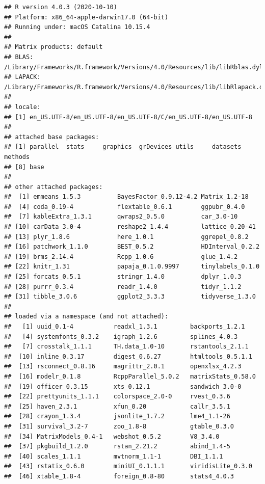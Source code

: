 \documentclass[
  11pt,
  english,
  ,doc,floatsintext]{apa6}
\begin{document}
\begin{verbatim}
## R version 4.0.3 (2020-10-10)
## Platform: x86_64-apple-darwin17.0 (64-bit)
## Running under: macOS Catalina 10.15.4
## 
## Matrix products: default
## BLAS:   /Library/Frameworks/R.framework/Versions/4.0/Resources/lib/libRblas.dylib
## LAPACK: /Library/Frameworks/R.framework/Versions/4.0/Resources/lib/libRlapack.dylib
## 
## locale:
## [1] en_US.UTF-8/en_US.UTF-8/en_US.UTF-8/C/en_US.UTF-8/en_US.UTF-8
## 
## attached base packages:
## [1] parallel  stats     graphics  grDevices utils     datasets  methods  
## [8] base     
## 
## other attached packages:
##  [1] emmeans_1.5.3          BayesFactor_0.9.12-4.2 Matrix_1.2-18         
##  [4] coda_0.19-4            flextable_0.6.1        ggpubr_0.4.0          
##  [7] kableExtra_1.3.1       qwraps2_0.5.0          car_3.0-10            
## [10] carData_3.0-4          reshape2_1.4.4         lattice_0.20-41       
## [13] plyr_1.8.6             here_1.0.1             ggrepel_0.8.2         
## [16] patchwork_1.1.0        BEST_0.5.2             HDInterval_0.2.2      
## [19] brms_2.14.4            Rcpp_1.0.6             glue_1.4.2            
## [22] knitr_1.31             papaja_0.1.0.9997      tinylabels_0.1.0      
## [25] forcats_0.5.1          stringr_1.4.0          dplyr_1.0.3           
## [28] purrr_0.3.4            readr_1.4.0            tidyr_1.1.2           
## [31] tibble_3.0.6           ggplot2_3.3.3          tidyverse_1.3.0       
## 
## loaded via a namespace (and not attached):
##   [1] uuid_0.1-4           readxl_1.3.1         backports_1.2.1     
##   [4] systemfonts_0.3.2    igraph_1.2.6         splines_4.0.3       
##   [7] crosstalk_1.1.1      TH.data_1.0-10       rstantools_2.1.1    
##  [10] inline_0.3.17        digest_0.6.27        htmltools_0.5.1.1   
##  [13] rsconnect_0.8.16     magrittr_2.0.1       openxlsx_4.2.3      
##  [16] modelr_0.1.8         RcppParallel_5.0.2   matrixStats_0.58.0  
##  [19] officer_0.3.15       xts_0.12.1           sandwich_3.0-0      
##  [22] prettyunits_1.1.1    colorspace_2.0-0     rvest_0.3.6         
##  [25] haven_2.3.1          xfun_0.20            callr_3.5.1         
##  [28] crayon_1.3.4         jsonlite_1.7.2       lme4_1.1-26         
##  [31] survival_3.2-7       zoo_1.8-8            gtable_0.3.0        
##  [34] MatrixModels_0.4-1   webshot_0.5.2        V8_3.4.0            
##  [37] pkgbuild_1.2.0       rstan_2.21.2         abind_1.4-5         
##  [40] scales_1.1.1         mvtnorm_1.1-1        DBI_1.1.1           
##  [43] rstatix_0.6.0        miniUI_0.1.1.1       viridisLite_0.3.0   
##  [46] xtable_1.8-4         foreign_0.8-80       stats4_4.0.3        

\end{verbatim}
\end{document}
